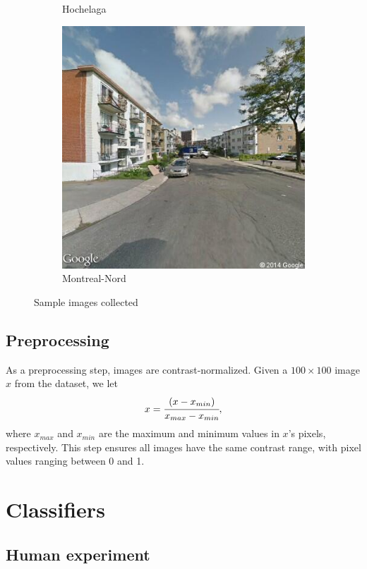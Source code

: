 \documentclass{acm_proc_article-sp}
\begin{document}
\begin{figure}[h!]
\begin{subfigure}[b]{0.3\linewidth}
		\caption{Hochelaga}
		\label{fig:hochelaga}
	\end{subfigure}
	\begin{subfigure}[b]{0.3\linewidth}
		\includegraphics[width=\linewidth]{montrealnord.png}
		\caption{Montreal-Nord}
		\label{fig:montrealnord}
	\end{subfigure}
\caption{Sample images collected \label{fig:sample-images}}
\end{figure}


\subsection{Preprocessing}
As a preprocessing step, images are contrast-normalized.  Given a $100\times100$ image $x$ from the dataset, we let $$x = \cfrac{(x - x_{min})}{x_{max} - x_{min}},$$ where $x_{max}$ and $x_{min}$ are the maximum and minimum values in $x$'s pixels, respectively. This step ensures all images have the same contrast range, with pixel values ranging between 0 and 1.
\section{Classifiers}

\subsection{Human experiment}
 
\end{document}
